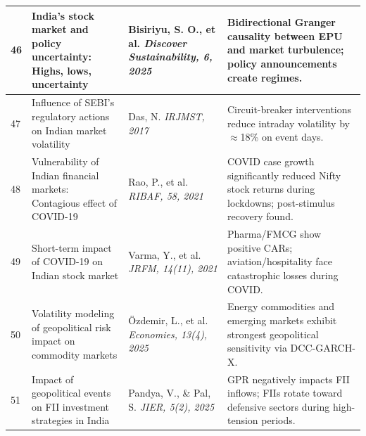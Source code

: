 \documentclass[12pt,a4paper,oneside]{report}
\theoremstyle{definition}
\theoremstyle{remark}
\begin{document}
\begin{center}
\begin{longtable}{|p{0.8cm}|p{4.2cm}|>{\raggedright\arraybackslash}p{4cm}|p{4.5cm}|}
46 & India's stock market and policy uncertainty: Highs, lows, uncertainty \cite{Bisiriyu2025EPUIndia} & Bisiriyu, S. O., et al. \newline\newline \textit{Discover Sustainability, 6, 2025} & Bidirectional Granger causality between EPU and market turbulence; policy announcements create regimes. \\ \hline

47 & Influence of SEBI's regulatory actions on Indian market volatility \cite{Das2017SEBI} & Das, N. \newline\newline \textit{IRJMST, 2017} & Circuit-breaker interventions reduce intraday volatility by $\approx$18\% on event days. \\ \hline

48 & Vulnerability of Indian financial markets: Contagious effect of COVID-19 \cite{Rao2021COVID19Contagion} & Rao, P., et al. \newline\newline \textit{RIBAF, 58, 2021} & COVID case growth significantly reduced Nifty stock returns during lockdowns; post-stimulus recovery found. \\ \hline

49 & Short-term impact of COVID-19 on Indian stock market \cite{Varma2021COVID19Impact} & Varma, Y., et al. \newline\newline \textit{JRFM, 14(11), 2021} & Pharma/FMCG show positive CARs; aviation/hospitality face catastrophic losses during COVID. \\ \hline

50 & Volatility modeling of geopolitical risk impact on commodity markets \cite{Ozdemir2025Geopolitical} & \"{O}zdemir, L., et al. \newline\newline \textit{Economies, 13(4), 2025} & Energy commodities and emerging markets exhibit strongest geopolitical sensitivity via DCC-GARCH-X. \\ \hline

51 & Impact of geopolitical events on FII investment strategies in India \cite{Pandya2025FIIGeopolitical} & Pandya, V., \& Pal, S. \newline\newline \textit{JIER, 5(2), 2025} & GPR negatively impacts FII inflows; FIIs rotate toward defensive sectors during high-tension periods. \\ \hline


\end{longtable}
\end{center}
\end{document}
